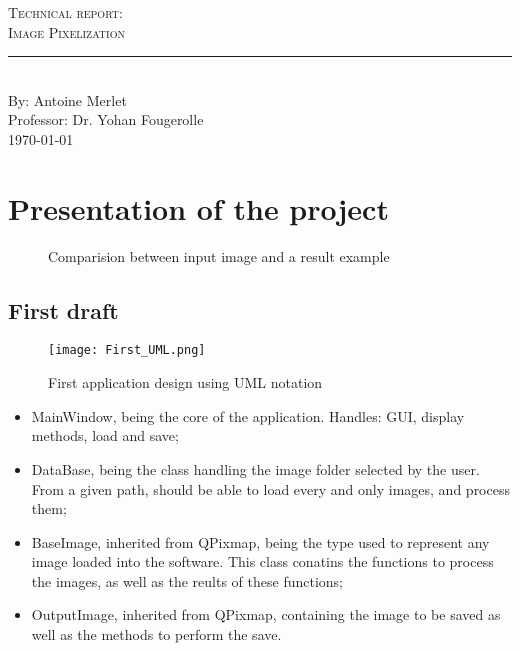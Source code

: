 \documentclass[aps,letterpaper,11pt]{revtex4}
\newcommand{\labno}{Technical report}
\newcommand{\labtitle}{Image Pixelization}
\newcommand{\authorname}{Antoine Merlet}
\newcommand{\professor}{Dr. Yohan Fougerolle}
\begin{document}
  
\begin{titlepage}
\begin{center}
{\LARGE \textsc{\labno:} \\ \vspace{4pt}}
{\Large \textsc{\labtitle} \\ \vspace{4pt}} 
\rule[13pt]{\textwidth}{1pt} \\ \vspace{150pt}
{\large By: \authorname \\ \vspace{10pt}
Professor: \professor \\ \vspace{10pt}
\today}
\end{center}




\end{titlepage}%
\newpage
\tableofcontents
\newpage

\section{Presentation of the project}
\begin{figure}[H]
    \centering
    \qquad
    \caption{Comparision between input image and a result example}
    \label{fig:example}%
\end{figure}

\subsection{First draft}

\begin{figure}[H]
	\centering
	\texttt{[image: First\_UML.png]}
	\caption{First application design using UML notation}
	\label{fig: FirstUML}    
\end{figure}


\begin{itemize}
  \item MainWindow, being the core of the application. Handles: GUI, display methods, load and save;
  \item DataBase, being the class handling the image folder selected by the user. From a given path, should be able to load every and only images, and process them;
  \item BaseImage, inherited from QPixmap, being the type used to represent any image loaded into the software. This class conatins the functions to process the images, as well as the reults of these functions;
  \item OutputImage, inherited from QPixmap, containing the image to be saved as well as the methods to perform the save.
\end{itemize}
\end{document}

